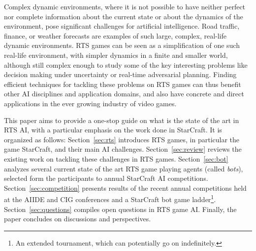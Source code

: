 \documentclass[journal]{IEEEtran}
\begin{document}
Complex dynamic environments, where it is not possible to have neither perfect nor complete information about the current state or about the dynamics of the environment, pose significant challenges for artificial intelligence. Road  traffic, finance, or
weather  forecasts are  examples of such large, complex, real-life dynamic
environments. RTS games can be seen as a simplification of one such real-life
environment, with simpler dynamics in a  finite and smaller
world, although still complex enough  to study some of the key interesting
problems like decision making  under
uncertainty  or  real-time adversarial planning. Finding efficient  techniques for
tackling  these problems  on  RTS  games can  thus  benefit other AI disciplines and application
domains, and also have concrete  and direct applications in  the ever growing
industry of  video games.%

This paper aims to provide a one-stop guide on what is the state of
the art in RTS AI, with a particular emphasis on the work done in StarCraft. 
It is organized as follows: Section~\ref{sec:rts}
introduces RTS games, in particular the game StarCraft,
and  their main  AI challenges.  Section~\ref{sec:review}
reviews  the existing  work on tackling these challenges in RTS games.
Section~\ref{sec:bot} analyzes several current state of the art RTS game playing agents (called {\em bots}), selected form the participants to annual
StarCraft    AI    competitions.
Section~\ref{sec:competition}  presents results of the recent annual competitions
held at the AIIDE  and CIG conferences and a StarCraft bot game ladder\footnote{An extended tournament, which can potentially go on indefinitely.}.  Section~\ref{sec:questions}
compiles open questions in RTS game AI. Finally, the paper concludes on discussions and perspectives.


\end{document}
